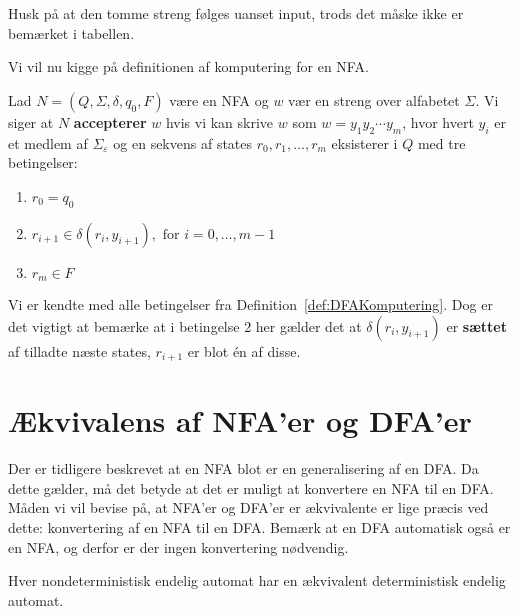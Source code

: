 Husk på at den tomme streng følges uanset input, trods det måske ikke er bemærket i tabellen.

Vi vil nu kigge på definitionen af komputering for en NFA.

\begin{definition}
  \label{def:NFAKomputering}
  Lad $N = (Q, \Sigma, \delta, q_{0}, F)$ være en NFA og $w$ vær en streng over alfabetet $\Sigma$. Vi siger at $N$ \textbf{accepterer} $w$ hvis vi kan skrive $w$ som $w = y_{1}y_{2} \cdots y_{m}$, hvor hvert $y_{i}$ er et medlem af $\Sigma_{\varepsilon}$ og en sekvens af states $r_{0}, r_{1}, \ldots, r_{m}$ eksisterer i $Q$ med tre betingelser:
  \begin{enumerate}
    \item $r_{0} = q_{0}$
    \item $r_{i+1} \in \delta(r_{i}, y_{i+1}), \text{ for } i = 0, \ldots, m - 1$
          \item $r_{m} \in F$
  \end{enumerate}
\end{definition}
  Vi er kendte med alle betingelser fra Definition~\ref{def:DFAKomputering}. Dog er det vigtigt at bemærke at i betingelse 2 her gælder det at $\delta(r_{i}, y_{i+1})$ er \textbf{sættet} af tilladte næste states, $r_{i+1}$ er blot én af disse.

\newpage
\section{Ækvivalens af NFA'er og DFA'er}
Der er tidligere beskrevet at en NFA blot er en generalisering af en DFA. Da dette gælder, må det betyde at det er muligt at konvertere en NFA til en DFA. Måden vi vil bevise på, at NFA'er og DFA'er er ækvivalente er lige præcis ved dette: konvertering af en NFA til en DFA. Bemærk at en DFA automatisk også er en NFA, og derfor er der ingen konvertering nødvendig.

\begin{theorem}
Hver nondeterministisk endelig automat har en ækvivalent deterministisk endelig automat.
\end{theorem}


